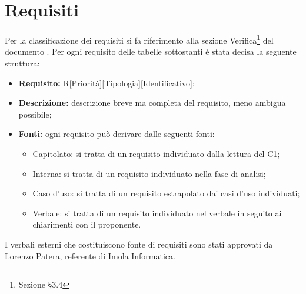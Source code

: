 \section{Requisiti}
Per la classificazione dei requisiti si fa riferimento alla sezione Verifica\footnote{Sezione §3.4} del documento .
Per ogni requisito delle tabelle sottostanti è stata decisa la seguente struttura: 
\begin{itemize}
	\item\textbf{Requisito:} R[Priorità][Tipologia][Identificativo];
	\item\textbf{Descrizione:} descrizione breve ma completa del requisito, meno ambigua possibile;
	\item\textbf{Fonti:} ogni requisito può derivare dalle seguenti fonti:
	\begin{itemize}
		\item Capitolato: si tratta di un requisito individuato dalla lettura del C1;
		\item Interna: si tratta di un requisito individuato nella fase di analisi;
		\item Caso d'uso: si tratta di un requisito estrapolato dai casi d'uso individuati;
		\item Verbale: si tratta di un requisito individuato nel verbale in seguito ai chiarimenti con il proponente.
	\end{itemize}
\end{itemize}
I verbali esterni che costituiscono fonte di requisiti sono stati approvati da Lorenzo Patera, referente di Imola Informatica.



